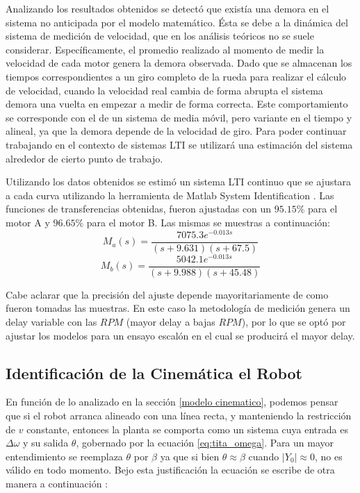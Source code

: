 \documentclass[10pt,conference,a4paper,onecolumn]{article}%
\begin{document}
Analizando los resultados obtenidos se detectó que existía una demora en el sistema no anticipada por el modelo matemático. Ésta se debe a la dinámica del sistema de medición de velocidad, que en los análisis teóricos no se suele considerar. Específicamente, el promedio realizado al momento de medir la velocidad de cada motor genera la demora observada. Dado que se almacenan los tiempos correspondientes a un giro completo de la rueda  para realizar el cálculo de velocidad, cuando la velocidad real cambia de forma abrupta el sistema demora una vuelta en empezar a medir de forma correcta. Este comportamiento se corresponde con el de un sistema de media móvil, pero variante en el tiempo y alineal, ya que la demora depende de la velocidad de giro. Para poder continuar trabajando en el contexto de sistemas LTI se utilizará una estimación del sistema alrededor de cierto punto de trabajo. 

Utilizando los datos obtenidos se estimó un sistema LTI continuo que se ajustara a cada curva utilizando la herramienta de Matlab System Identification \cite{Sys_ident}. Las funciones de transferencias obtenidas, fueron ajustadas con un $ 95.15\%$ para el motor A y $ 96.65\%$ para el motor B. Las mismas se muestras a continuación:
\begin{equation}
M_a(s)= \frac{7075.3 e^{-0.013s}}{(s+9.631)(s+67.5)}
\end{equation}
\begin{equation}
M_b(s)= \frac{5042.1 e^{-0.013s}}{(s+9.988) (s+45.48)}
\end{equation}

Cabe aclarar que la precisión del ajuste depende mayoritariamente de como fueron tomadas las muestras. En este caso la metodología de medición genera un delay variable con las $RPM$ (mayor delay a bajas $RPM$), por lo que se optó por ajustar los modelos para un ensayo escalón en el cual se producirá el mayor delay. 
\subsection{Identificación de la Cinemática el Robot}
En función de lo analizado en la sección \ref{modelo cinematico}, podemos pensar que si el robot arranca alineado con una línea recta, y manteniendo la restricción de $v$ constante, entonces la planta se comporta como un sistema cuya entrada es $\Delta \omega$ y su salida $\theta$, gobernado por la ecuación \ref{eq:tita_omega}. Para un mayor entendimiento se reemplaza $\theta$ por $\beta$ ya que si bien $\theta \approx \beta $ cuando $|Y_0| \approx 0$, no es válido en todo momento. Bejo esta justificación la ecuación se escribe de otra manera a continuación :
\end{document}

